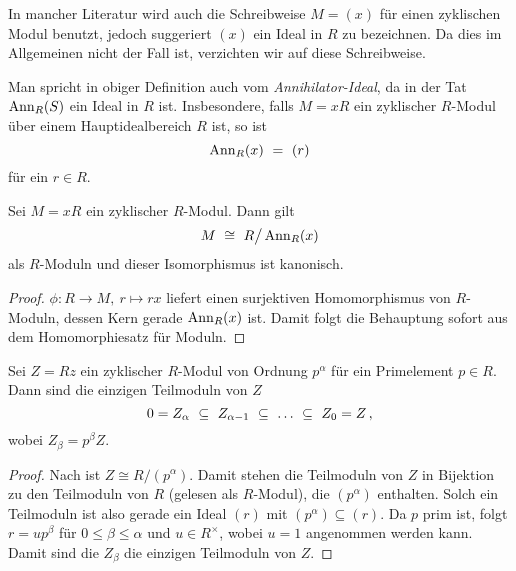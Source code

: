 \begin{bemerkung}
  In mancher Literatur wird auch die Schreibweise $M = (x)$ für einen
  zyklischen Modul benutzt, jedoch suggeriert $(x)$ ein Ideal in $R$ zu
  bezeichnen. Da dies im Allgemeinen nicht der Fall ist, verzichten wir auf
  diese Schreibweise.
\end{bemerkung}

\begin{bemerkung}
  Man spricht in obiger Definition auch vom \emph{Annihilator-Ideal}, da in der
  Tat $\operatorname{Ann}_R(S)$ ein Ideal in $R$ ist. Insbesondere, falls 
  $M = xR$ ein zyklischer $R$-Modul über einem Hauptidealbereich $R$ ist, so
  ist 
  \[ \operatorname{Ann}_R(x) \ =\  (r)\]
  für ein $r\in R$.
\end{bemerkung}


\begin{lemma}
  \label{lemma:zyklischer_modul_iso}
  Sei $M = xR$ ein zyklischer $R$-Modul. Dann gilt
  \[M \ \cong\  R\big/\operatorname{Ann}_R(x)\]
  als $R$-Moduln und dieser Isomorphismus ist kanonisch.
\end{lemma}
\begin{proof}
  $\phi:R \to M,\ r \mapsto rx$ liefert einen surjektiven Homomorphismus von
  $R$-Moduln, dessen Kern gerade $\operatorname{Ann}_R(x)$ ist. Damit folgt die Behauptung
  sofort aus dem Homomorphiesatz für Moduln.
\end{proof}

\begin{lemma}
  \label{lemma:teilmoduln_prim_moduln}
  Sei $Z = Rz$ ein zyklischer $R$-Modul von Ordnung $p^\alpha$ für ein
  Primelement $p\in R$. Dann sind die einzigen Teilmoduln von $Z$
  \[ 0 = Z_\alpha \ \subseteq\  Z_{\alpha-1} \ \subseteq\  \ldots
    \ \subseteq\  Z_0 = Z \,,\]
  wobei $Z_\beta = p^\beta Z$.
\end{lemma}
\begin{proof}
  Nach  ist $Z \cong R\big/(p^\alpha)$. Damit
  stehen die Teilmoduln von $Z$ in Bijektion zu den Teilmoduln von
  $R$ (gelesen als $R$-Modul), die $(p^\alpha)$ enthalten. Solch ein
  Teilmoduln ist also gerade ein Ideal $(r)$ mit 
  $(p^\alpha)\subseteq (r)$. Da $p$ prim ist, folgt $r = up^\beta$ für
  $0\leq\beta \leq \alpha$ und $u\in R^\times$, wobei $u=1$ \obda angenommen
  werden kann. Damit sind die $Z_\beta$ die einzigen Teilmoduln von $Z$.
\end{proof}



